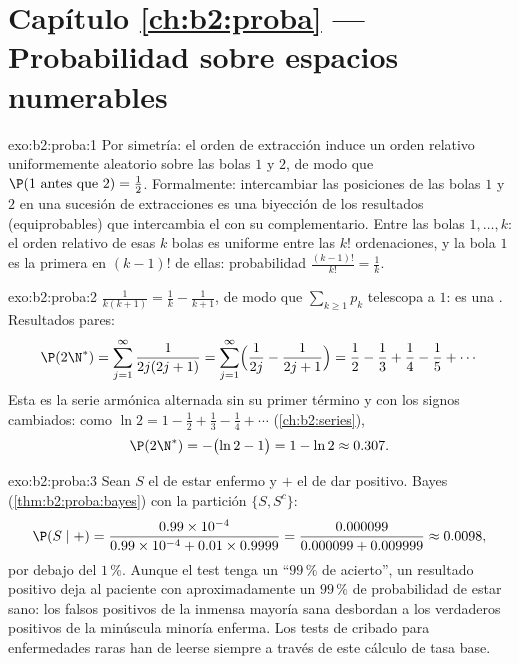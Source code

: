 \section*{Capítulo \ref{ch:b2:proba} --- Probabilidad sobre espacios numerables}

\begin{solution}{exo:b2:proba:1}
Por simetría: el orden de extracción induce un orden relativo
uniformemente aleatorio sobre las bolas $1$ y $2$, de modo que $\P(1
\text{ antes que } 2) = \frac12$. Formalmente: intercambiar las
posiciones de las bolas $1$ y $2$ en una sucesión de extracciones es
una biyección de los resultados (equiprobables) que intercambia el
 con su complementario. Entre las bolas $1, \dots, k$: el
orden relativo de esas $k$ bolas es uniforme entre las $k!$
ordenaciones, y la bola $1$ es la primera en $(k-1)!$ de ellas:
probabilidad $\frac{(k-1)!}{k!} = \frac1k$.
\end{solution}

\begin{solution}{exo:b2:proba:2}
$\frac{1}{k(k+1)} = \frac1k - \frac1{k+1}$, de modo que $\sum_{k\geq1}
p_k$ telescopa a $1$: es una . Resultados
pares:
\[
\P(2\N^*) = \sum_{j=1}^{\infty}\frac{1}{2j(2j+1)}
= \sum_{j=1}^{\infty}\Bigl(\frac{1}{2j} - \frac{1}{2j+1}\Bigr)
= \frac12 - \frac13 + \frac14 - \frac15 + \cdots
\]
Esta es la serie armónica alternada sin su primer término y con los
signos cambiados: como $\ln 2 = 1 - \frac12 + \frac13 - \frac14 +
\cdots$ (\cref{ch:b2:series}),
\[
\P(2\N^*) = -\bigl(\ln 2 - 1\bigr) = 1 - \ln 2 \approx 0.307 .
\]
\end{solution}

\begin{solution}{exo:b2:proba:3}
Sean $S$ el  de estar enfermo y $+$ el de dar positivo. Bayes
(\cref{thm:b2:proba:bayes}) con la partición $\{S, S^c\}$:
\[
\P(S \mid +)
= \frac{0.99 \times 10^{-4}}
       {0.99 \times 10^{-4} + 0.01 \times 0.9999}
= \frac{0.000099}{0.000099 + 0.009999}
\approx 0.0098 ,
\]
por debajo del $1\,\%$. Aunque el test tenga un ``$99\,\%$ de
acierto'', un resultado positivo deja al paciente con
aproximadamente un $99\,\%$ de probabilidad de estar sano: los falsos
positivos de la inmensa mayoría sana desbordan a los verdaderos
positivos de la minúscula minoría enferma. Los tests de cribado para
enfermedades raras han de leerse siempre a través de este cálculo de
tasa base.
\end{solution}

